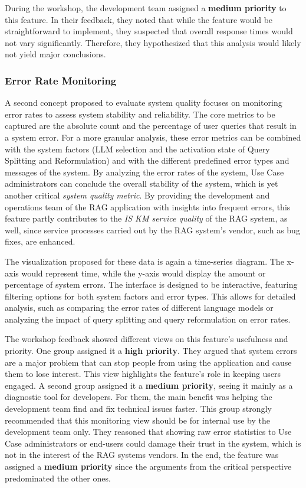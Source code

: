 \documentclass[
	english,
	ruledheaders=section,%
	class=report,%
	thesis={type=bachelor},%
	accentcolor=1b,%
	custommargins=true,%
	marginpar=false,%
	parskip=half-,%
	fontsize=11pt,%
	DIV=14,
]{tudapub}
\begin{document}
During the workshop, the development team assigned a \textbf{medium priority} to this feature. In their feedback, they noted that while the feature would be straightforward to implement, they suspected that overall response times would not vary significantly. Therefore, they hypothesized that this analysis would likely not yield major conclusions.

\subsubsection{Error Rate Monitoring}
A second concept proposed to evaluate system quality focuses on monitoring error rates to assess system stability and reliability. The core metrics to be captured are the absolute count and the percentage of user queries that result in a system error. For a more granular analysis, these error metrics can be combined with the system factors (LLM selection and the activation state of Query Splitting and Reformulation) and with the different predefined error types and messages of the system. By analyzing the error rates of the system, Use Case administrators can conclude the overall stability of the system, which is yet another critical \textit{system quality metric}. By providing the development and operations team of the RAG application with insights into frequent errors, this feature partly contributes to the \textit{IS KM service quality} of the RAG system, as well, since service processes carried out by the RAG system's vendor, such as bug fixes, are enhanced.

The visualization proposed for these data is again a time-series diagram. The x-axis would represent time, while the y-axis would display the amount or percentage of system errors. The interface is designed to be interactive, featuring filtering options for both system factors and error types. This allows for detailed analysis, such as comparing the error rates of different language models or analyzing the impact of query splitting and query reformulation on error rates.

The workshop feedback showed different views on this feature's usefulness and priority. One group assigned it a \textbf{high priority}. They argued that system errors are a major problem that can stop people from using the application and cause them to lose interest. This view highlights the feature's role in keeping users engaged. A second group assigned it a \textbf{medium priority}, seeing it mainly as a diagnostic tool for developers. For them, the main benefit was helping the development team find and fix technical issues faster. This group strongly recommended that this monitoring view should be for internal use by the development team only. They reasoned that showing raw error statistics to Use Case administrators or end-users could damage their trust in the system, which is not in the interest of the RAG systems vendors. In the end, the feature was assigned a \textbf{medium priority} since the arguments from the critical perspective predominated the other ones.
\end{document}
